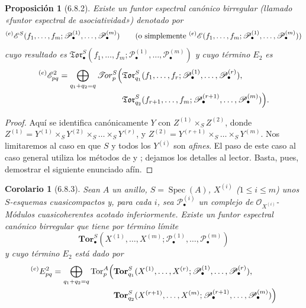 \documentclass[10pt,oneside,openany]{book}
\theoremstyle{egaenv}\newtheorem*{env}{---}
\theoremstyle{egastatement}
\newtheorem*{proposition}{Proposición}
\newtheorem*{corollary}{Corolario}
\theoremstyle{egadescription}
\renewcommand{\leq}{\leqslant}
\begin{document}
\begin{proposition}[6.8.2]
Existe un funtor espectral canónico birregular \textup{(llamado «funtor espectral
de asociatividad»)} denotado por
\[
  {}^{(e)}\mathscr E^S
  (f_1,\ldots,f_m;
   \mathscr P_\bullet^{(1)},\ldots,\mathscr P_\bullet^{(m)})
  \qquad\textup{(o simplemente ${}^{(e)}\mathscr E(f_1,\ldots,f_m;
\mathscr P_\bullet^{(1)},\ldots,\mathscr P_\bullet^{(m)})$)}
\]
cuyo
resultado es
$\mathfrak{Tor}_\bullet^S(f_1,\ldots,f_m;
\mathscr P_\bullet^{(1)},\ldots,\mathscr P_\bullet^{(m)})$
y cuyo término $E_2$ es
\[
\begin{split}
  {}^{(e)}\mathscr E_{pq}^2
  =\bigoplus_{q_1+q_2=q}
  \mathscr{T}\!or_p^S\Bigl(
  &\mathfrak{Tor}_{q_1}^S
  (f_1,\ldots,f_r;
   \mathscr P_\bullet^{(1)},\ldots,\mathscr P_\bullet^{(r)}),\\
  &\mathfrak{Tor}_{q_2}^S
  (f_{r+1},\ldots,f_m;
   \mathscr P_\bullet^{(r+1)},\ldots,\mathscr P_\bullet^{(m)})
  \Bigr).
\end{split}
\]
\end{proposition}

\begin{proof}
Aquí se identifica canónicamente $Y$ con
$Z^{(1)}\times_S Z^{(2)}$, donde
$Z^{(1)}=Y^{(1)}\times_S Y^{(2)}\times_S\ldots\times_S Y^{(r)}$, y
$Z^{(2)}=Y^{(r+1)}\times_S\ldots\times_S Y^{(m)}$. Nos limitaremos al
caso en que $S$ y todos los $Y^{(i)}$ son \emph{afines}.
El paso de este caso al caso general utiliza los métodos de
 y ; dejamos los detalles al
lector. Basta, pues, demostrar el siguiente enunciado afín.
\end{proof}

\begin{corollary}[6.8.3]
Sean $A$ un anillo, $S=\operatorname{Spec}(A)$, $X^{(i)}$
($1\leq i\leq m$) unos $S$-esquemas cuasicompactos y, para cada $i$, sea
$\mathscr P_\bullet^{(i)}$ un complejo de
$\mathscr O_{X^{(i)}}$-Módulos cuasicoherentes acotado inferiormente. Existe
un funtor espectral canónico birregular que tiene por término límite
\[
  \mathbf{Tor}_\bullet^S
  (X^{(1)},\ldots,X^{(m)};
   \mathscr P_\bullet^{(1)},\ldots,\mathscr P_\bullet^{(m)})
\]
y cuyo término $E_2$ está dado por
\[
\begin{split}
  {}^{(e)}E_{pq}^2
  =\bigoplus_{q_1+q_2=q}
  \operatorname{Tor}_p^A\Bigl(
  &\mathbf{Tor}_{q_1}^S
  (X^{(1)},\ldots,X^{(r)};
   \mathscr P_\bullet^{(1)},\ldots,\mathscr P_\bullet^{(r)}),\\
  &\mathbf{Tor}_{q_2}^S
  (X^{(r+1)},\ldots,X^{(m)};
   \mathscr P_\bullet^{(r+1)},\ldots,\mathscr P_\bullet^{(m)})
  \Bigr)
\end{split}
\]
\end{corollary}
\end{document}
